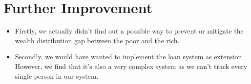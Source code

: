 \section{Further Improvement}
\begin{itemize}
	\item Firstly, we actually didn't find out a possible way to prevent or mitigate the wealth distribution gap between the poor and the rich.
	\item Secondly, we would have wanted to implement the loan system as extension. However, we find that it's also a very complex system as we can't track every single person in our system. 
\end{itemize}
